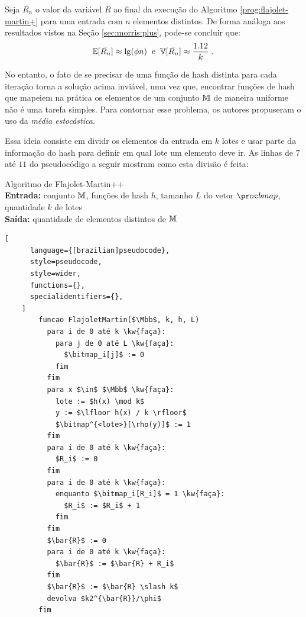 Seja $\bar{R_n}$ o valor da variável $\bar{R}$ ao final da execução do Algoritmo \ref{prog:flajolet-martin+} para uma
entrada com $n$ elementos distintos. De forma análoga aos resultados vistos na Seção \ref{sec:morris:plus}, pode-se
concluir que:
\[ \Ebb[\bar{R_n}] \approx \lg(\phi n)  \; \; \text{e}  \; \; \Vbb[\bar{R_n}] \approx \frac{1.12}{k} \ . \]


No entanto, o fato de se precisar de uma função de hash distinta para cada iteração torna a solução acima inviável, 
uma vez que, encontrar funções de hash que mapeiem na prática os elementos de um conjunto $\mathbb{M}$ de maneira
uniforme não é uma tarefa simples. Para contornar esse problema, os autores propuseram o uso da 
\textit{média estocástica}.

Essa ideia consiste em dividr os elementos da entrada em $k$ lotes e usar parte da informação do hash para definir em 
qual lote um elemento deve ir. 
As linhas de $7$ até $11$ do pseudocódigo a seguir mostram como esta divisão é feita:
\begin{programruledcaption}{
  Algoritmo de Flajolet-Martin++
  \\ \textbf{Entrada:} conjunto $\mathbb{M}$, funções de hash $h$, tamanho $L$ do vetor $\bitmap$, 
  quantidade $k$ de lotes
  \\ \textbf{Saída:} quantidade de elementos distintos de $\mathbb{M}$
  \label{prog:flajolet-martin++}
  }
    \begin{lstlisting}[
      language={[brazilian]pseudocode},
      style=pseudocode,
      style=wider,
      functions={},
      specialidentifiers={},
    ]
        funcao FlajoletMartin($\Mbb$, k, h, L)
          para i de 0 até k \kw{faça}:
            para j de 0 até L \kw{faça}:
              $\bitmap_i[j]$ := 0
            fim
          fim
          para x $\in$ $\Mbb$ \kw{faça}:
            lote := $h(x) \mod k$
            y := $\lfloor h(x) / k \rfloor$
            $\bitmap^{<lote>}[\rho(y)]$ := 1
          fim
          para i de 0 até k \kw{faça}:
            $R_i$ := 0
          fim
          para i de 0 até k \kw{faça}:
            enquanto $\bitmap_i[R_i]$ = 1 \kw{faça}:
              $R_i$ := $R_i$ + 1
            fim
          fim
          $\bar{R}$ := 0
          para i de 0 até k \kw{faça}:
            $\bar{R}$ := $\bar{R} + R_i$ 
          fim
          $\bar{R}$ := $\bar{R} \slash k$
          devolva $k2^{\bar{R}}/\phi$
        fim
    \end{lstlisting}
  \end{programruledcaption}

